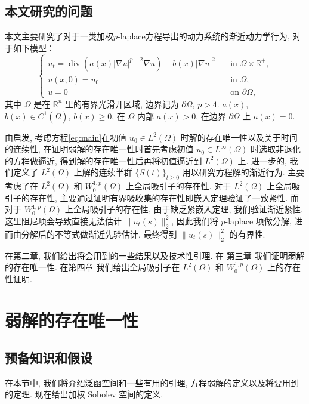 \documentclass[oneside,longtitle]{LZUthesis}
\numberwithin{equation}{chapter}
\newcommand*\abs[1]{\lvert#1\rvert}
\newcommand*\norm[1]{\lVert#1\rVert}
\newcommand*\Brace[1]{\lbrace#1\rbrace}
\newcommand\R{\mathbb{R}}
\DeclareMathOperator{\Div}{div}
\begin{document}
\section{本文研究的问题}
本文主要研究了对于一类加权$p$-laplace方程导出的动力系统的渐近动力学行为,
对于如下模型：
\begin{equation}\label{eq:main}
	\begin{cases}
		u_t = \Div(a(x)\abs{\nabla u}^{p-2}\nabla u) - b(x)\abs{\nabla u}^2 \quad &\text{in } \Omega \times \R^+,\\
		u(x,0) = u_0 \quad &\text{in } \Omega,\\
		u = 0 \quad &\text{on } \partial\Omega,
	\end{cases}
\end{equation}
其中 $\Omega$ 是在 $\R^{n}$ 里的有界光滑开区域, 边界记为 $\partial\Omega$, $p>4$.
$ a(x)$, $b(x) \in C^1(\bar{\Omega}) $, $b(x) \geq 0$, 在 $\Omega$ 内部 $a(x) > 0$, 在边界 $\partial\Omega$ 上 $a(x) = 0$.

由\citep{Zhan2019Uniquenessa}启发, 考虑方程\eqref{eq:main}在初值 $u_0 \in L^2(\Omega)$ 时解的存在唯一性以及关于时间的连续性,
在证明弱解的存在唯一性时首先考虑初值 $u_0 \in L^\infty(\Omega)$ 时选取非退化的方程做逼近,
得到解的存在唯一性后再将初值逼近到 $L^2(\Omega)$ 上.
进一步的, 我们定义了 $L^2(\Omega) $ 上解的连续半群 $\Brace{S(t)}_{t \geq 0} $ 用以研究方程解的渐近行为.
主要考虑了在 $L^2(\Omega)$ 和 $W_0^{1, p}(\Omega)$ 上全局吸引子的存在性.
对于 $L^2(\Omega)$ 上全局吸引子的存在性,
主要通过证明有界吸收集的存在性即嵌入定理验证了一致紧性.
而对于 $W_0^{1, p}(\Omega)$ 上全局吸引子的存在性,
由于缺乏紧嵌入定理, 我们验证渐近紧性, 这里阻尼项会导致直接无法估计
$\norm{u_t(s)}_2^2$, 因此我们将 $p$-laplace 项做分解, 进而由分解后的不等式做渐近先验估计, 最终得到 $\norm{u_t(s)}_2^2$ 的有界性.

在第二章,
我们给出将会用到的一些结果以及技术性引理. 在
第三章
我们证明弱解的存在唯一性.
在第四章
我们给出全局吸引子在
$L^2(\Omega)$ 和 $W_0^{1,p}(\Omega)$ 上的存在性证明.

\chapter{弱解的存在唯一性}\label{ch:Existence_and_uniqueness_of_the_weak_solution}
\section{预备知识和假设}\label{ch:preliminaries}
在本节中, 我们将介绍泛函空间和一些有用的引理,
方程弱解的定义以及将要用到的定理.
现在给出加权 Sobolev 空间的定义.
\end{document}
